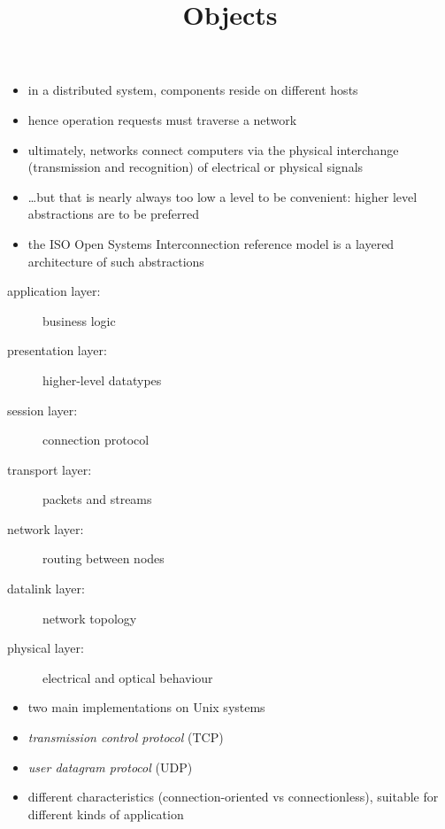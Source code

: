 \documentclass{sepslide-soa-faked} %
\title{Objects}
\begin{document}
\begin{slide}
  \Title
\end{slide}

\begin{slide}
  \Contents
\end{slide}

\begin{slide}
  \begin{itemize}
  \item in a distributed system, components reside on different hosts
  \item hence operation requests must traverse a network
  \item ultimately, networks connect computers via the physical interchange
    (transmission and recognition) of electrical or physical signals
  \item \ldots but that is nearly always too low a level to be convenient:
    higher level abstractions are to be preferred
  \item the ISO Open Systems Interconnection reference model is a layered
    architecture of such abstractions
  \end{itemize}
\end{slide}

\begin{slide}
  \begin{description}
  \item[application layer:] business logic
  \item[presentation layer:] higher-level datatypes
  \item[session layer:] connection protocol
  \item[transport layer:] packets and streams
  \item[network layer:] routing between nodes
  \item[datalink layer:] network topology
  \item[physical layer:] electrical and optical behaviour
  \end{description}
\end{slide}

\begin{slide}
  \begin{itemize}
  \item two main implementations on Unix systems
  \item \emph{transmission control protocol} (TCP)
  \item \emph{user datagram protocol} (UDP)
  \item different characteristics (connection-oriented vs connectionless),
    suitable for different kinds of application
  \end{itemize}
\end{slide}
\end{document}
